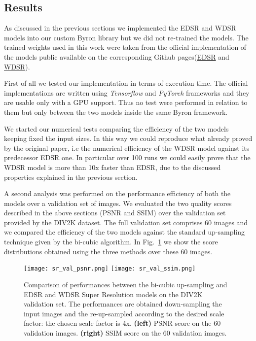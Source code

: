\documentclass{standalone}
\begin{document}
\subsection[Results]{Results}\label{SR:results}

As discussed in the previous sections we implemented the EDSR and WDSR models into our custom \textsf{Byron} library but we did not re-trained the models.
The trained weights used in this work were taken from the official implementation of the models public available on the corresponding Github pages(\href{}{EDSR} and \href{}{WDSR}). %

First of all we tested our implementation in terms of execution time.
The official implementations are written using \emph{Tensorflow} and \emph{PyTorch} frameworks and they are usable only with a GPU support.
Thus no test were performed in relation to them but only between the two models inside the same \textsf{Byron} framework.

We started our numerical tests comparing the efficiency of the two models keeping fixed the input sizes.
In this way we could reproduce what already proved by the original paper, i.e the numerical efficiency of the WDSR model against its predecessor EDSR one.
In particular over 100 runs we could easily prove that the WDSR model is more than 10x faster than EDSR, due to the discussed properties explained in the previous section.

A second analysis was performed on the performance efficiency of both the models over a validation set of images.
We evaluated the two quality scores described in the above sections (PSNR and SSIM) over the validation set provided by the DIV2K dataset.
The full validation set comprises 60 images and we compared the efficiency of the two models against the standard up-sampling technique given by the bi-cubic algorithm.
In Fig.~\ref{fig:sr_validation} we show the score distributions obtained using the three methods over these 60 images.

\begin{center}
\begin{figure}[htbp]
\centering
\texttt{[image: sr\_val\_psnr.png]}
\quad
\texttt{[image: sr\_val\_ssim.png]}
\caption{Comparison of performances between the bi-cubic up-sampling and EDSR and WDSR Super Resolution models on the DIV2K validation set.
The performances are obtained down-sampling the input images and the re-up-sampled according to the desired scale factor: the chosen scale factor is 4x.
\textbf{(left)} PSNR score on the 60 validation images.
\textbf{(right)} SSIM score on the 60 validation images.
}
\label{fig:sr_validation}
\end{figure}
\end{center}
\end{document}
